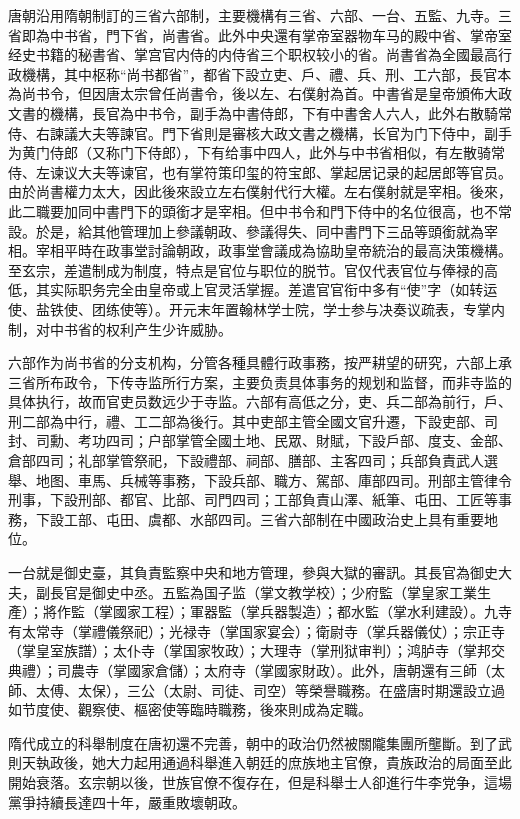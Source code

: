 唐朝沿用隋朝制訂的三省六部制，主要機構有三省、六部、一台、五監、九寺。三省即為中书省，門下省，尚書省。此外中央還有掌帝室器物车马的殿中省、掌帝室经史书籍的秘書省、掌宫官内侍的内侍省三个职权较小的省。尚書省為全國最高行政機構，其中枢称“尚书都省”，都省下設立吏、戶、禮、兵、刑、工六部，長官本為尚书令，但因唐太宗曾任尚書令，後以左、右僕射為首。中書省是皇帝頒佈大政文書的機構，長官為中书令，副手為中書侍郎，下有中書舍人六人，此外右散騎常侍、右諫議大夫等諫官。門下省則是審核大政文書之機構，长官为门下侍中，副手为黄门侍郎（又称门下侍郎），下有给事中四人，此外与中书省相似，有左散骑常侍、左谏议大夫等谏官，也有掌符策印玺的符宝郎、掌起居记录的起居郎等官员。由於尚書權力太大，因此後來設立左右僕射代行大權。左右僕射就是宰相。後來，此二職要加同中書門下的頭銜才是宰相。但中书令和門下侍中的名位很高，也不常設。於是，給其他管理加上參議朝政、參議得失、同中書門下三品等頭銜就為宰相。宰相平時在政事堂討論朝政，政事堂會議成為協助皇帝統治的最高決策機構。至玄宗，差遣制成为制度，特点是官位与职位的脱节。官仅代表官位与俸禄的高低，其实际职务完全由皇帝或上官灵活掌握。差遣官官衔中多有“使”字（如转运使、盐铁使、团练使等）。开元末年置翰林学士院，学士参与决奏议疏表，专掌内制，对中书省的权利产生少许威胁。

六部作为尚书省的分支机构，分管各種具體行政事務，按严耕望的研究，六部上承三省所布政令，下传寺监所行方案，主要负责具体事务的规划和监督，而非寺监的具体执行，故而官吏员数远少于寺监。六部有高低之分，吏、兵二部為前行，戶、刑二部為中行，禮、工二部為後行。其中吏部主管全國文官升遷，下設吏部、司封、司勳、考功四司；户部掌管全國土地、民眾、財賦，下設戶部、度支、金部、倉部四司；礼部掌管祭祀，下設禮部、祠部、膳部、主客四司；兵部負責武人選舉、地图、車馬、兵械等事務，下設兵部、職方、駕部、庫部四司。刑部主管律令刑事，下設刑部、都官、比部、司門四司；工部負責山澤、紙筆、屯田、工匠等事務，下設工部、屯田、虞都、水部四司。三省六部制在中國政治史上具有重要地位。

一台就是御史臺，其負責監察中央和地方管理，參與大獄的審訊。其長官為御史大夫，副長官是御史中丞。五監為国子监（掌文教学校）；少府監（掌皇家工業生產）；將作監（掌國家工程）；軍器監（掌兵器製造）；都水監（掌水利建設）。九寺有太常寺（掌禮儀祭祀）；光禄寺（掌国家宴会）；衛尉寺（掌兵器儀仗）；宗正寺（掌皇室族譜）；太仆寺（掌国家牧政）；大理寺（掌刑狱审判）；鸿胪寺（掌邦交典禮）；司農寺（掌國家倉儲）；太府寺（掌國家財政）。此外，唐朝還有三師（太師、太傅、太保），三公（太尉、司徒、司空）等榮譽職務。在盛唐时期還設立過如节度使、觀察使、樞密使等臨時職務，後來則成為定職。

隋代成立的科舉制度在唐初還不完善，朝中的政治仍然被關隴集團所壟斷。到了武則天執政後，她大力起用通過科舉進入朝廷的庶族地主官僚，貴族政治的局面至此開始衰落。玄宗朝以後，世族官僚不復存在，但是科舉士人卻進行牛李党争，這場黨爭持續長達四十年，嚴重敗壞朝政。

